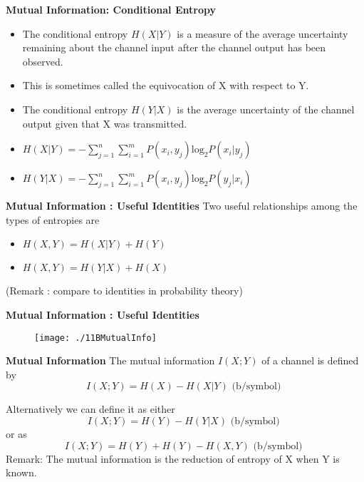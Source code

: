 
\noindent \textbf{Mutual Information: Conditional Entropy}
\begin{itemize}
\item The conditional entropy $H(X|Y)$ is a
measure of the average uncertainty remaining about the channel input after the channel output has
been observed. \item This is sometimes called the equivocation of X with respect to Y.  \item The
conditional entropy $H(Y|X)$ is the average uncertainty of the channel output given that X was
transmitted.
\end{itemize}
\begin{itemize}
\item $H(X|Y)= - \sum ^{n}_{j=1}\sum ^{m}_{i=1} P(x_i,y_j) \mbox{log}_2 P(x_i|y_j)$
\item $H(Y|X)= - \sum ^{n}_{j=1}\sum ^{m}_{i=1} P(x_i,y_j) \mbox{log}_2 P(y_j|x_i)$
\end{itemize}


\noindent \textbf{Mutual Information : Useful Identities}
Two useful relationships among the types of entropies are
\begin{itemize}
\item $H(X,Y)=H(X|Y)+H(Y) $
\item $H(X,Y)=H(Y|X)+H(X) $
\end{itemize}
(Remark : compare to identities in probability theory)


\noindent \textbf{Mutual Information : Useful Identities}
\begin{figure}
\centering
\texttt{[image: ./11BMutualInfo]}
\caption{}
\label{fig:11BMutualInfo}
\end{figure}








\noindent \textbf{Mutual Information}
The mutual information $I(X; Y)$ of a channel is defined by
\[ I(X; Y) = H(X) -  H(X|Y) \mbox{    (b/symbol) } \]

Alternatively we can define it as either
\[ I(X; Y) = H(Y) -  H(Y|X) \mbox{     (b/symbol) } \]
 or as
\[ I(X; Y) = H(Y)+ H(Y)  - H(X,Y) \mbox{    (b/symbol) } \]
Remark: The
mutual information is the reduction of
entropy of X when Y
is
known.